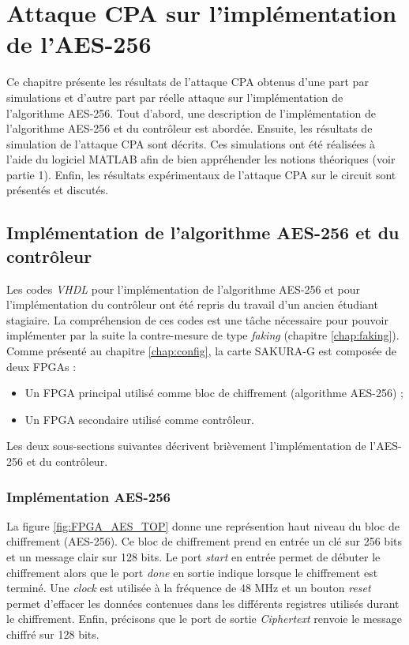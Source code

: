 \documentclass[oneside]{book}
\begin{document}
\newpage


\chapter{Attaque CPA sur l'implémentation de l'AES-256}
\label{chap:CPA_Result}

Ce chapitre présente les résultats de l'attaque CPA obtenus d'une part par simulations et d'autre part par réelle attaque sur l'implémentation de l'algorithme AES-256. Tout d'abord, une description de l'implémentation de l'algorithme AES-256 et du contrôleur est abordée. Ensuite, les résultats de simulation de l'attaque CPA sont décrits. Ces simulations ont été réalisées à l'aide du logiciel MATLAB afin de bien appréhender les notions théoriques (voir partie 1). Enfin, les résultats expérimentaux de l'attaque CPA sur le circuit sont présentés et discutés. 

\section{Implémentation de l'algorithme AES-256 et du contrôleur}
\label{sec:AES_256}

Les codes \textit{VHDL} pour l'implémentation de l'algorithme AES-256 et pour l'implémentation du contrôleur ont été repris du travail d'un ancien étudiant stagiaire. La compréhension de ces codes est une tâche nécessaire pour pouvoir implémenter par la suite la contre-mesure de type \textit{faking} (chapitre \ref{chap:faking}). Comme présenté au chapitre \ref{chap:config}, la carte SAKURA-G est composée de deux FPGAs : 
\begin{itemize}
\item Un FPGA principal utilisé comme bloc de chiffrement (algorithme AES-256) ;
\item Un FPGA secondaire utilisé comme contrôleur.
\end{itemize}

\hspace{-0.5cm}Les deux sous-sections suivantes décrivent brièvement l'implémentation de l'AES-256 et du contrôleur.

\subsection{Implémentation AES-256}
\label{sec:Imp_AES_256}

La figure \ref{fig:FPGA_AES_TOP} donne une représention haut niveau du bloc de chiffrement (AES-256). Ce bloc de chiffrement prend en entrée un clé sur 256 bits et un message clair sur 128 bits. Le port \textit{start} en entrée permet de débuter le chiffrement alors que le port \textit{done} en sortie indique lorsque le chiffrement est terminé. Une \textit{clock} est utilisée à la fréquence de 48 MHz et un bouton \textit{reset} permet d'effacer les données contenues dans les différents registres utilisés durant le chiffrement. Enfin, précisons que le port de sortie \textit{Ciphertext} renvoie le message chiffré sur 128 bits.
\end{document}
